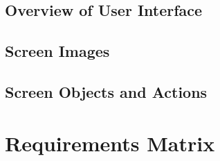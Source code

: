 \documentclass[onecolumn, draftclsnofoot,10pt, compsoc]{article}
\begin{document}
	\subsection{Overview of User Interface}
	
	\subsection{Screen Images}
	
	\subsection{Screen Objects and Actions}

\section{Requirements Matrix}
\end{document}
